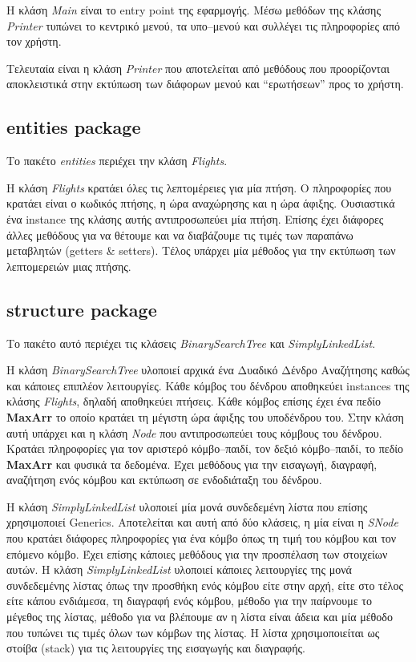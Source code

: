 \documentclass[a4paper]{article}
\begin{document}
Η κλάση \emph{Main} είναι το entry point της εφαρμογής. Μέσω μεθόδων της κλάσης
\emph{Printer} τυπώνει το κεντρικό μενού, τα υπο--μενού και συλλέγει τις
πληροφορίες από τον χρήστη.

Τελευταία είναι η κλάση \emph{Printer} που αποτελείται από μεθόδους που
προορίζονται αποκλειστικά στην εκτύπωση των διάφορων μενού και ``ερωτήσεων''
προς το χρήστη.

\subsection{entities package}
Το πακέτο \emph{entities} περιέχει την κλάση \emph{Flights}.

Η κλάση \emph{Flights} κρατάει όλες τις λεπτομέρειες για μία πτήση. Ο
πληροφορίες που κρατάει είναι ο κωδικός πτήσης, η ώρα αναχώρησης και η ώρα
άφιξης. Ουσιαστικά ένα instance της κλάσης αυτής αντιπροσωπεύει μία πτήση.
Επίσης έχει διάφορες άλλες μεθόδους για να θέτουμε και να διαβάζουμε τις τιμές
των παραπάνω μεταβλητών (getters \& setters). Τέλος υπάρχει μία μέθοδος για την
εκτύπωση των λεπτομερειών μιας πτήσης.

\subsection{structure package}
Το πακέτο αυτό περιέχει τις κλάσεις \emph{BinarySearchTree} και
\emph{SimplyLinkedList}.

Η κλάση \emph{BinarySearchTree} υλοποιεί αρχικά ένα Δυαδικό Δένδρο Αναζήτησης
καθώς και κάποιες επιπλέον λειτουργίες. Κάθε κόμβος του δένδρου αποθηκεύει
instances της κλάσης \emph{Flights}, δηλαδή αποθηκεύει πτήσεις. Κάθε κόμβος
επίσης έχει ένα πεδίο \textbf{MaxArr} το οποίο κρατάει τη μέγιστη ώρα άφιξης του
υποδένδρου του. Στην κλάση αυτή υπάρχει και η κλάση \emph{Node} που
αντιπροσωπεύει τους κόμβους του δένδρου. Κρατάει πληροφορίες για τον αριστερό
κόμβο--παιδί, τον δεξιό κόμβο--παιδί, το πεδίο \textbf{MaxArr} και φυσικά τα
δεδομένα. Έχει μεθόδους για την εισαγωγή, διαγραφή, αναζήτηση ενός κόμβου και
εκτύπωση σε ενδοδιάταξη του δένδρου.

H κλάση \emph{SimplyLinkedList} υλοποιεί μία μονά συνδεδεμένη λίστα που
επίσης χρησιμοποιεί Generics. Αποτελείται και αυτή από δύο κλάσεις, η μία είναι η
\emph{SNode} που κρατάει διάφορες πληροφορίες για ένα κόμβο όπως τη τιμή του
κόμβου και τον επόμενο κόμβο. Έχει επίσης κάποιες μεθόδους για την προσπέλαση
των στοιχείων αυτών. Η κλάση \emph{SimplyLinkedList} υλοποιεί κάποιες
λειτουργίες της μονά συνδεδεμένης λίστας όπως την προσθήκη ενός κόμβου είτε στην
αρχή, είτε στο τέλος είτε κάπου ενδιάμεσα, τη διαγραφή ενός κόμβου, μέθοδο για
την παίρνουμε το μέγεθος της λίστας, μέθοδο για να βλέπουμε αν η λίστα είναι
άδεια και μία μέθοδο που τυπώνει τις τιμές όλων των κόμβων της λίστας. Η λίστα
χρησιμοποιείται ως στοίβα (stack) για τις λειτουργίες της εισαγωγής και
διαγραφής.
\end{document}
